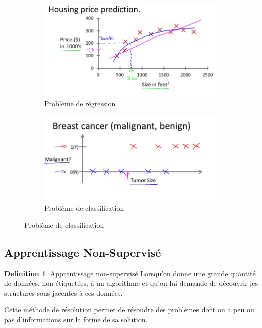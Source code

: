 \documentclass{article}
\theoremstyle{definition}
\newtheorem{definition}{Definition}[section]
\begin{document}
\begin{figure}[h!]
  \centering
  \begin{subfigure}[b]{0.49\linewidth}
    \includegraphics[width=\linewidth]{supervised}
    \caption{Problème de régression}
  \end{subfigure}
  \begin{subfigure}[b]{0.49\linewidth}
    \includegraphics[width=\linewidth]{supervised2}
    \caption{Problème de classification}
  \end{subfigure}
\label{fig:coffee}
\end{figure}
\subsection{Apprentissage Non-Supervisé}
\begin{definition}{Apprentissage non-supervisé
Lorsqu'on donne une grande quantité de données, non-étiquetées, à un algorithme et qu'on lui demande de découvrir les structures sous-jacentes à ces données.}
\end{definition}
Cette méthode de résolution permet de résoudre des problèmes dont on a peu ou pas d'informations sur la forme de sa solution. \par
\newpage
\end{document}
